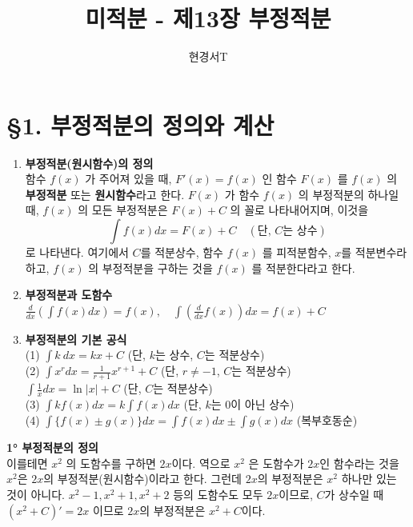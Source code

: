 \documentclass[a4paper,11pt]{article}
\title{\textbf{미적분 - 제13장 부정적분}}
\author{현경서T}
\date{}
\begin{document}
\maketitle

\section*{§1. 부정적분의 정의와 계산}

\begin{conceptbox}[기본 정석]
\begin{enumerate}
    \item \textbf{부정적분(원시함수)의 정의}\\
    함수 $f(x)$ 가 주어져 있을 때, $F'(x)=f(x)$ 인 함수 $F(x)$ 를 $f(x)$ 의 \textbf{부정적분} 또는 \textbf{원시함수}라고 한다. $F(x)$ 가 함수 $f(x)$ 의 부정적분의 하나일 때, $f(x)$ 의 모든 부정적분은 $F(x)+C$ 의 꼴로 나타내어지며, 이것을
    \[ \int f(x)dx=F(x)+C \quad (\text{단, } C \text{는 상수}) \]
    로 나타낸다. 여기에서 $C$를 적분상수, 함수 $f(x)$ 를 피적분함수, $x$를 적분변수라 하고, $f(x)$ 의 부정적분을 구하는 것을 $f(x)$ 를 적분한다라고 한다.
    \item \textbf{부정적분과 도함수}\\
    $\displaystyle \frac{d}{dx} \left( \int f(x)dx \right) = f(x), \quad \int \left( \frac{d}{dx}f(x) \right) dx = f(x)+C$
    \item \textbf{부정적분의 기본 공식}\\
    (1) $\displaystyle \int k~dx=kx+C$ (단, $k$는 상수, $C$는 적분상수)\\
    (2) $\displaystyle \int x^{r}dx=\frac{1}{r+1}x^{r+1}+C$ (단, $r \ne -1$, $C$는 적분상수)\\
    \hspace{1.5em} $\displaystyle \int\frac{1}{x}dx=\ln|x|+C$ (단, $C$는 적분상수)\\
    (3) $\displaystyle \int kf(x)dx=k\int f(x)dx$ (단, $k$는 0이 아닌 상수)\\
    (4) $\displaystyle \int \{f(x) \pm g(x)\}dx = \int f(x)dx \pm \int g(x)dx$ (복부호동순)
\end{enumerate}
\end{conceptbox}

\begin{advicebox}
\textbf{1° 부정적분의 정의}\\
이를테면 $x^{2}$ 의 도함수를 구하면 $2x$이다. 역으로 $x^{2}$ 은 도함수가 $2x$인 함수라는 것을 $x^2$은 $2x$의 부정적분(원시함수)이라고 한다. 그런데 $2x$의 부정적분은 $x^2$ 하나만 있는 것이 아니다. $x^2-1, x^2+1, x^2+2$ 등의 도함수도 모두 $2x$이므로, $C$가 상수일 때 $(x^2+C)'=2x$ 이므로 $2x$의 부정적분은 $x^2+C$이다.
\end{advicebox}
\end{document}
